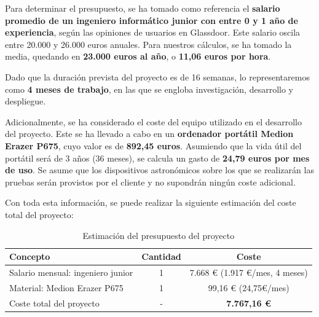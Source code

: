 Para determinar el presupuesto, se ha tomado como referencia el \textbf{salario promedio de un ingeniero informático junior con entre 0 y 1 año de experiencia}, según las opiniones de usuarios en Glassdoor\cite{glassdoor}. Este salario oscila entre 20.000 y 26.000 euros anuales. Para nuestros cálculos, se ha tomado la media, quedando en \textbf{23.000 euros al año}, o \textbf{11,06 euros por hora}.

Dado que la duración prevista del proyecto es de 16 semanas, lo representaremos como \textbf{4 meses de trabajo}, en las que se engloba investigación, desarrollo y despliegue.

Adicionalmente, se ha considerado el coste del equipo utilizado en el desarrollo del proyecto. Este se ha llevado a cabo en un \textbf{ordenador portátil Medion Erazer P675}, cuyo valor es de \textbf{892,45 euros}\cite{medion}. Asumiendo que la vida útil del portátil será de 3 años (36 meses), se calcula un gasto de \textbf{24,79 euros por mes de uso}. Se asume que los dispositivos astronómicos sobre los que se realizarán las pruebas serán provistos por el cliente y no supondrán ningún coste adicional.

Con toda esta información, se puede realizar la siguiente estimación del coste total del proyecto:

\begin{table}[h]
\centering
\begin{tabular}{|l|c|c|}
\hline
\textbf{Concepto}                         & \textbf{Cantidad} & \textbf{Coste} 							\\ \hline
Salario mensual: ingeniero junior      &  1         		  &        7.668 € (1.917 €/mes, 4 meses)    \\ \hline
Material: Medion Erazer P675   & 1 				  &          99,16 € (24,75€/mes)      					\\ \hline
Coste total del proyecto         		  &          -         & \textbf{7.767,16 €} 						\\ \hline
\end{tabular}
\caption{Estimación del presupuesto del proyecto}
\end{table}